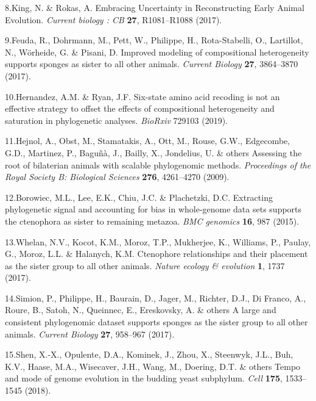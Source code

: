 \documentclass[]{article}
\begin{document}
\leavevmode\hypertarget{ref-King:2017ie}{}%
8.King, N. \& Rokas, A. Embracing Uncertainty in Reconstructing Early
Animal Evolution. \emph{Current biology : CB} \textbf{27}, R1081--R1088
(2017).

\leavevmode\hypertarget{ref-feuda2017improved}{}%
9.Feuda, R., Dohrmann, M., Pett, W., Philippe, H., Rota-Stabelli, O.,
Lartillot, N., Wörheide, G. \& Pisani, D. Improved modeling of
compositional heterogeneity supports sponges as sister to all other
animals. \emph{Current Biology} \textbf{27}, 3864--3870 (2017).

\leavevmode\hypertarget{ref-hernandez2019six}{}%
10.Hernandez, A.M. \& Ryan, J.F. Six-state amino acid recoding is not an
effective strategy to offset the effects of compositional heterogeneity
and saturation in phylogenetic analyses. \emph{BioRxiv} 729103 (2019).

\leavevmode\hypertarget{ref-hejnol2009assessing}{}%
11.Hejnol, A., Obst, M., Stamatakis, A., Ott, M., Rouse, G.W.,
Edgecombe, G.D., Martinez, P., Baguñà, J., Bailly, X., Jondelius, U. \&
others Assessing the root of bilaterian animals with scalable
phylogenomic methods. \emph{Proceedings of the Royal Society B:
Biological Sciences} \textbf{276}, 4261--4270 (2009).

\leavevmode\hypertarget{ref-borowiec2015extracting}{}%
12.Borowiec, M.L., Lee, E.K., Chiu, J.C. \& Plachetzki, D.C. Extracting
phylogenetic signal and accounting for bias in whole-genome data sets
supports the ctenophora as sister to remaining metazoa. \emph{BMC
genomics} \textbf{16}, 987 (2015).

\leavevmode\hypertarget{ref-whelan2017ctenophore}{}%
13.Whelan, N.V., Kocot, K.M., Moroz, T.P., Mukherjee, K., Williams, P.,
Paulay, G., Moroz, L.L. \& Halanych, K.M. Ctenophore relationships and
their placement as the sister group to all other animals. \emph{Nature
ecology \& evolution} \textbf{1}, 1737 (2017).

\leavevmode\hypertarget{ref-simion2017large}{}%
14.Simion, P., Philippe, H., Baurain, D., Jager, M., Richter, D.J., Di
Franco, A., Roure, B., Satoh, N., Queinnec, E., Ereskovsky, A. \& others
A large and consistent phylogenomic dataset supports sponges as the
sister group to all other animals. \emph{Current Biology} \textbf{27},
958--967 (2017).

\leavevmode\hypertarget{ref-shen2018tempo}{}%
15.Shen, X.-X., Opulente, D.A., Kominek, J., Zhou, X., Steenwyk, J.L.,
Buh, K.V., Haase, M.A., Wisecaver, J.H., Wang, M., Doering, D.T. \&
others Tempo and mode of genome evolution in the budding yeast
subphylum. \emph{Cell} \textbf{175}, 1533--1545 (2018).
\end{document}
